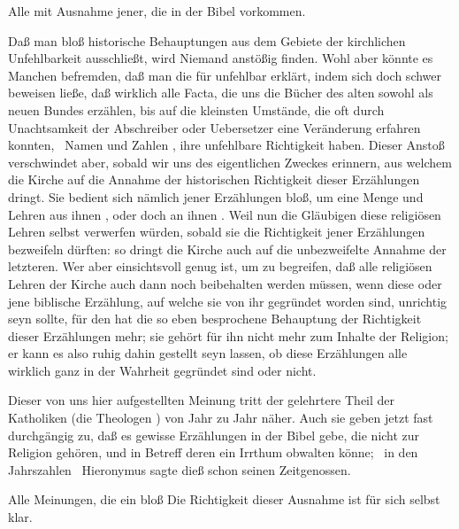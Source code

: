 \begin{aufza}
\begin{aufzb}
\begin{aufzc}
\end{aufzc}
\item Alle  mit Ausnahme jener, die in der Bibel vorkommen.\par
Daß man bloß historische Behauptungen aus dem Gebiete der kirchlichen Unfehlbarkeit ausschließt, wird Niemand anstößig finden. Wohl aber könnte es Manchen befremden, daß man die  für unfehlbar erklärt, indem sich doch schwer beweisen ließe, daß wirklich alle Facta, die uns die Bücher des alten sowohl als neuen Bundes erzählen, bis auf die kleinsten Umstände, die oft durch Unachtsamkeit der Abschreiber oder Uebersetzer eine Veränderung erfahren konnten, \zB\ Namen und Zahlen \udgl , ihre unfehlbare Richtigkeit haben. Dieser Anstoß verschwindet aber, sobald wir uns des eigentlichen Zweckes erinnern, aus welchem die Kirche auf die Annahme der historischen Richtigkeit dieser Erzählungen dringt. Sie bedient sich nämlich jener Erzählungen bloß, um eine Menge  und  Lehren aus ihnen , oder doch an ihnen . Weil nun die Gläubigen diese religiösen Lehren selbst verwerfen würden, sobald sie die Richtigkeit jener Erzählungen bezweifeln dürften: so dringt die Kirche auch auf die unbezweifelte Annahme der letzteren. Wer aber einsichtsvoll genug ist, um zu begreifen, daß alle religiösen Lehren der Kirche auch dann noch beibehalten werden müssen, wenn diese oder jene biblische Erzählung, auf welche sie von ihr gegründet worden sind, unrichtig seyn sollte, für den hat die so eben besprochene Behauptung der Richtigkeit dieser Erzählungen  mehr; sie gehört für ihn nicht mehr zum Inhalte der Religion; er kann es also ruhig dahin gestellt seyn lassen, ob diese Erzählungen alle wirklich ganz in der Wahrheit gegründet sind oder nicht.
\begin{RWanm} Dieser von uns hier aufgestellten Meinung tritt der gelehrtere Theil der Katholiken (die Theologen \uA ) von Jahr zu Jahr näher. Auch sie geben jetzt fast durchgängig zu, daß es gewisse Erzählungen in der Bibel gebe, die nicht zur Religion gehören, und in Betreff deren ein Irrthum obwalten könne; \zB\ in den Jahrszahlen \udgl\  Hieronymus sagte dieß schon seinen Zeitgenossen.~
\end{RWanm}
\item Alle Meinungen, die ein bloß  Die Richtigkeit dieser Ausnahme ist für sich selbst klar.
\end{aufzb}
\end{aufza}


